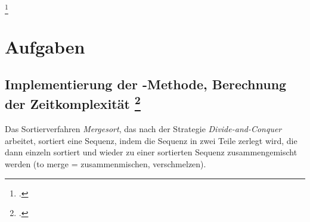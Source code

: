 \documentclass{lehramt-informatik}
\begin{document}
\footcite[Seite 134 (PDF 152)]{saake}

%

\chapter{Aufgaben}

\section{Implementierung der -Methode, Berechnung der
Zeitkomplexität
\footcite[Seite 2, Aufgabe 3: Mergesort]{aud:ab:7}
}

Das Sortierverfahren \emph{Mergesort}, das nach der Strategie
\emph{Divide-and-Conquer} arbeitet, sortiert eine Sequenz, indem die
Sequenz in zwei Teile zerlegt wird, die dann einzeln sortiert und wieder
zu einer sortierten Sequenz zusammengemischt werden (to merge =
zusammenmischen, verschmelzen).
\end{document}

